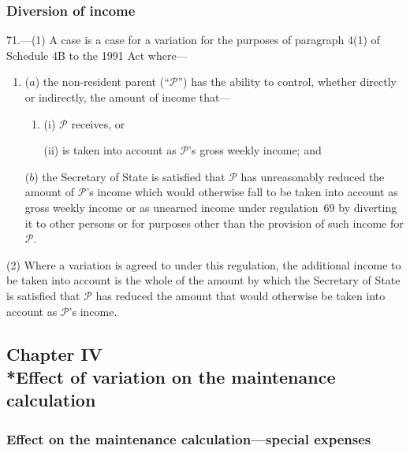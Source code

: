 \documentclass[12pt,a4paper]{article}
\begin{document}

\subsubsection[71. Diversion of income]{Diversion of income}

71.---(1)  A case is a case for a variation for the purposes of paragraph 4(1) of Schedule 4B to the 1991 Act where—
\begin{enumerate}\item[]
($a$) the non-resident parent (“$\mathcal{P}$”) has the ability to control, whether directly or indirectly, the amount of income that—
\begin{enumerate}\item[]
(i) $\mathcal{P}$ receives, or

(ii) is taken into account as $\mathcal{P}$’s gross weekly income; and
\end{enumerate}

($b$) the Secretary of State is satisfied that $\mathcal{P}$ has unreasonably reduced the amount of $\mathcal{P}$’s income which would otherwise fall to be taken into account as gross weekly income or as unearned income under regulation~69 by diverting it to other persons or for purposes other than the provision of such income for $\mathcal{P}$.
\end{enumerate}

(2) Where a variation is agreed to under this regulation, the additional income to be taken into account is the whole of the amount by which the Secretary of State is satisfied that $\mathcal{P}$ has reduced the amount that would otherwise be taken into account as $\mathcal{P}$’s income.

\subsection[Chapter IV --- Effect of variation on the maintenance calculation]{Chapter IV\\*Effect of variation on the maintenance calculation}

\renewcommand\parthead{--- Part V Chapter IV}

\subsubsection[72. Effect on the maintenance calculation---special expenses]{Effect on the maintenance calculation---special expenses}
\end{document}
